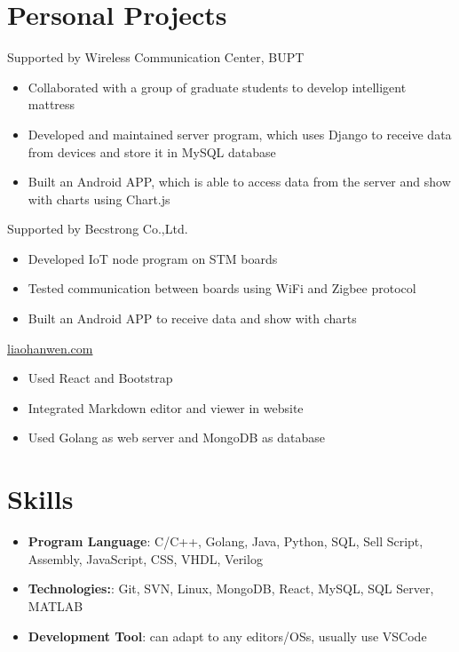 \documentclass{resume}
\begin{document}
\section{Personal Projects}
Supported by Wireless Communication Center, BUPT
\begin{itemize}[parsep=0.25ex]
    \item Collaborated with a group of graduate students to develop intelligent mattress
    \item Developed and maintained server program, which uses Django to receive data from devices and store it in MySQL database
    \item Built an Android APP, which is able to access data from the server and show with charts using Chart.js
\end{itemize}
Supported by Becstrong Co.,Ltd.
\begin{itemize}[parsep=0.25ex]
    \item Developed IoT node program on STM boards
    \item Tested communication between boards using WiFi and Zigbee protocol
    \item Built an Android APP to receive data and show with charts
\end{itemize}
\href{https://liaohanwen.com}{liaohanwen.com}
\begin{itemize}[parsep=0.25ex]
    \item Used React and Bootstrap
    \item Integrated Markdown editor and viewer in website
    \item Used Golang as web server and MongoDB as database
\end{itemize}

\section{Skills}
\begin{itemize}[parsep=0.25ex]
    \item
          \textbf{Program Language}:
          C/C++, Golang, Java, Python, SQL, Sell Script, Assembly, JavaScript, CSS, VHDL, Verilog
    \item
          \textbf{Technologies:}:
          Git, SVN, Linux, MongoDB, React, MySQL, SQL Server, MATLAB
    \item
          \textbf{Development Tool}:
          can adapt to any editors/OSs, usually use VSCode
\end{itemize}
\end{document}
